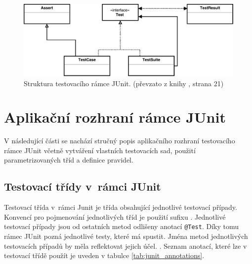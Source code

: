    \begin{figure}
      \includegraphics[width=\textwidth, center]{obrazky-figures/junit_arch.pdf}
      \caption{Struktura testovacího rámce JUnit. (převzato z knihy \cite{JUnitGuide}, strana 21)}
      \label{fig:junit_arch}
    \end{figure}


  \section{Aplikační rozhraní rámce JUnit}
  V následující části se nachází stručný popis aplikačního rozhraní testovacího rámce JUnit včetně vytváření vlastních testovacích sad, použití parametrizovaných tříd a definice pravidel.

    \subsection{Testovací třídy v~rámci JUnit}
    Testovací třída v~rámci Junit je třída obsahující jednotlivé testovací případy. Konvencí pro pojmenování jednotlivých tříd je použití sufixu . Jednotlivé testovací případy jsou od ostatních metod odlišeny anotací \texttt{@Test}. Díky tomu rámec JUnit pozná jednotlivé testy, které má spustit. Jména metod jednotlivých testovacích případů by měla reflektovat jejich účel.  \cite{vogella:JUnit}. Seznam anotací, které lze v testovací třídě použít je uveden v tabulce \ref{tab:junit_annotations}.

